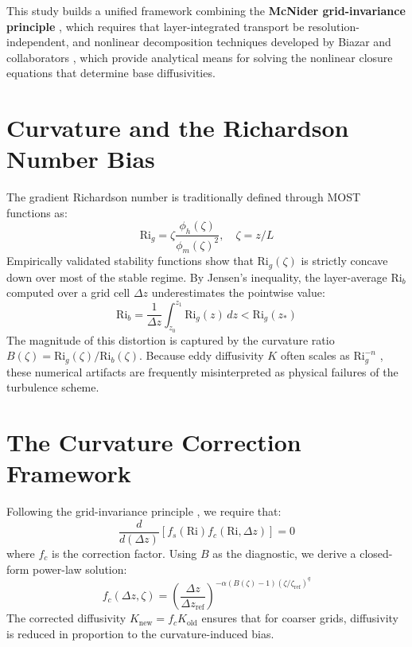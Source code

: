 \documentclass[12pt, a4paper]{article}
\newcommand{\Rig}{\text{Ri}_g}
\newcommand{\Rib}{\text{Ri}_b}
\newcommand{\zetaRef}{\zeta_{\text{ref}}}
\begin{document}
This study builds a unified framework combining the \textbf{McNider grid-invariance principle} \cite{England1995}, which requires that layer-integrated transport be resolution-independent, and nonlinear decomposition techniques developed by Biazar and collaborators \cite{England2025}, which provide analytical means for solving the nonlinear closure equations that determine base diffusivities.

\section{Curvature and the Richardson Number Bias}
The gradient Richardson number is traditionally defined through MOST functions as:
\begin{equation}
    \Rig = \zeta \frac{\phi_h(\zeta)}{\phi_m(\zeta)^2}, \quad \zeta = z/L
\end{equation}
Empirically validated stability functions \cite{Businger1971, Dyer1974, Hogstrom1988} show that $\Rig(\zeta)$ is strictly concave down over most of the stable regime. By Jensen's inequality, the layer-average $\Rib$ computed over a grid cell $\Delta z$ underestimates the pointwise value:
\begin{equation}
    \Rib = \frac{1}{\Delta z} \int_{z_0}^{z_1} \Rig(z) \, dz < \Rig(z_*)
\end{equation}
The magnitude of this distortion is captured by the curvature ratio $B(\zeta) = \Rig(\zeta)/\Rib(\zeta)$. Because eddy diffusivity $K$ often scales as $\Rig^{-n}$ \cite{Louis1979}, these numerical artifacts are frequently misinterpreted as physical failures of the turbulence scheme.

\section{The Curvature Correction Framework}
Following the grid-invariance principle \cite{England1995}, we require that:
\begin{equation}
    \frac{d}{d(\Delta z)} \left[ f_s(\text{Ri}) f_c(\text{Ri}, \Delta z) \right] = 0
\end{equation}
where $f_c$ is the correction factor. Using $B$ as the diagnostic, we derive a closed-form power-law solution:
\begin{equation}
    f_c(\Delta z, \zeta) = \left( \frac{\Delta z}{\Delta z_{\text{ref}}} \right)^{-\alpha(B(\zeta)-1)(\zeta/\zetaRef)^q}
\end{equation}
The corrected diffusivity $K_{\text{new}} = f_c K_{\text{old}}$ ensures that for coarser grids, diffusivity is reduced in proportion to the curvature-induced bias.
\end{document}
